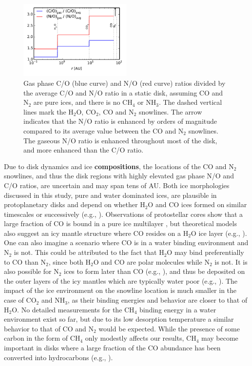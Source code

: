 \documentclass[apj]{emulateapj}
\begin{document}
\begin{figure}[h!]
\centering
\includegraphics[width=0.5\textwidth]{CN_norm.pdf}
\caption{Gas phase C/O (blue curve) and N/O (red curve) ratios divided by the average C/O and N/O ratio in a static disk, assuming CO and N$_2$ are pure ices, and there is no CH$_4$ or NH$_3$. The dashed vertical lines mark the H$_2$O, CO$_2$, CO and N$_2$ snowlines. The arrow indicates that the N/O ratio is enhanced by orders of magnitude compared to its average value between the CO and N$_2$ snowlines. The gaseous N/O ratio is enhanced throughout most of the disk, and more enhanced than the C/O ratio.}  
\label{fig:enhance}
\end{figure}




Due to disk dynamics and ice \textbf{compositions}, the locations of the CO and N$_2$ snowlines, and thus the disk regions with highly elevated gas phase N/O and C/O ratios, are uncertain and may span tens of AU. Both ice morphologies discussed in this study, pure and water dominated ices, are plausible in protoplanetary disks and depend on whether H$_2$O and CO ices formed on similar timescales or successively (e.g., \citealt{garrod11}). Observations of protostellar cores show that a large fraction of CO is bound in a pure ice multilayer \citep{pontoppidan03}, but theoretical models also suggest an icy mantle structure where CO resides on a H$_2$O ice layer (e.g., \citealt{collings03}). One can also imagine a scenario where CO is in a water binding environment and N$_2$ is not. This could be attributed to the fact that H$_2$O may bind preferentially to CO than N$_2$, since both H$_2$O and CO are polar molecules while N$_2$ is not. It is also possible for N$_2$ ices to form later than CO (e.g., \citealt{pagani12}), and thus be deposited on the outer layers of the icy mantles which are typically water poor (e.g., \citealt{garrod11}). The impact of the ice environment on the snowline location is much smaller in the case of CO$_2$ and NH$_3$, as their binding energies and behavior are closer to that of H$_2$O. No detailed measurements for the CH$_4$ binding energy in a water environment exist so far, but due to its low desorption temperature a similar behavior to that of CO and N$_2$ would be expected. While the presence of some carbon in the form of CH$_4$ only modestly affects our results, CH$_4$ may become important in disks where a large fraction of the CO abundance has been converted into hydrocarbons (e.g., \citealt{du15}). 
\end{document}
